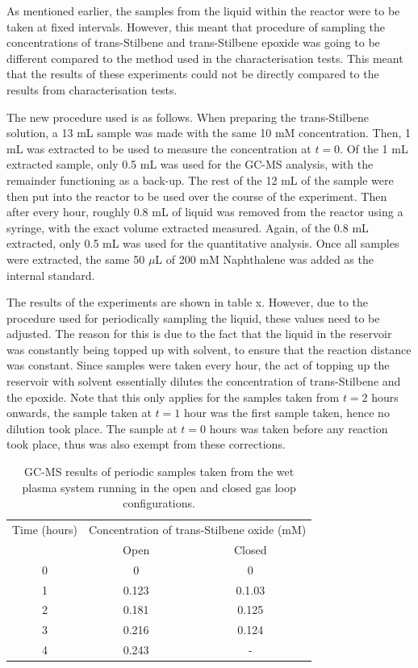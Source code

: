 As mentioned earlier, the samples from the liquid within the reactor were to be taken at fixed intervals. However, this meant that procedure of sampling the concentrations of trans-Stilbene and trans-Stilbene epoxide was going to be different compared to the method used in the characterisation tests. This meant that the results of these experiments could not be directly compared to the results from characterisation tests. 

The new procedure used is as follows. When preparing the trans-Stilbene solution, a 13 mL sample was made with the same 10 mM concentration. Then, 1 mL was extracted to be used to measure the concentration at $t=0$. Of the 1 mL extracted sample, only 0.5 mL was used for the GC-MS analysis, with the remainder functioning as a back-up. The rest of the 12 mL of the sample were then put into the reactor to be used over the course of the experiment. Then after every hour, roughly 0.8 mL of liquid was removed from the reactor using a syringe, with the exact volume extracted measured. Again, of the 0.8 mL extracted, only 0.5 mL was used for the quantitative analysis. Once all samples were extracted, the same 50 $\mu$L of 200 mM Naphthalene was added as the internal standard. 

The results of the experiments are shown in table x. However, due to the procedure used for periodically sampling the liquid, these values need to be adjusted. The reason for this is due to the fact that the liquid in the reservoir was constantly being topped up with solvent, to ensure that the reaction distance was constant. Since samples were taken every hour, the act of topping up the reservoir with solvent essentially dilutes the concentration of trans-Stilbene and the epoxide. Note that this only applies for the samples taken from $t=2$ hours onwards, the sample taken at $t=1$ hour was the first sample taken, hence no dilution took place. The sample at $t=0$ hours was taken before any reaction took place, thus was also exempt from these corrections.

\begin{table}[]
\centering
\caption{GC-MS results of periodic samples taken from the wet plasma system running in the open and closed gas loop configurations.}
\label{tb:raw_open_closed_loop_data}
\begin{tabular}{ccc}
Time (hours) & \multicolumn{2}{c}{Concentration of trans-Stilbene oxide (mM)}          \\
                                     & \multicolumn{1}{c}{Open} & \multicolumn{1}{c}{Closed} \\
\hline
0 & 0 & 0 \\
1 & 0.123 & 0.1.03 \\
2 & 0.181 & 0.125 \\
3 & 0.216 & 0.124 \\
4 & 0.243 & -                                  
\end{tabular}
\end{table}

